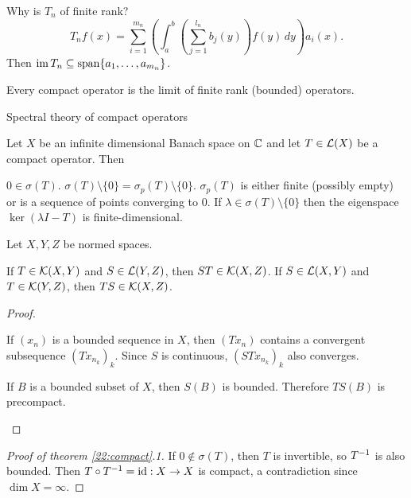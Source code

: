 Why is $T_n$ of finite rank?
\[ T_nf(x) = \sum_{i=1}^{m_n} \left( \int_a^b \left( \sum_{j=1}^{l_n} b_j(y) \right) f(y) \, dy \right) a_i(x). \]
Then $\operatorname{im} T_n \subseteq \operatorname{span}\{a_1,\ldots,a_{m_n}\}$.

\begin{rmk}
  Every compact operator is the limit of finite rank (bounded) operators.
\end{rmk}

Spectral theory of compact operators

\begin{thm}\label{22:compact}
  Let $X$ be an infinite dimensional Banach space on $\mathbb{C}$ and let $T \in \mathcal{L}(X)$ be a compact operator.
  Then
  \begin{enum}
    \io $0 \in \sigma(T)$.
    \io $\sigma(T) \setminus \{0\} = \sigma_p(T) \setminus \{0\}$.
    \io $\sigma_p(T)$ is either finite (possibly empty) or is a sequence of points converging to $0$.
    \io If $\lambda \in \sigma(T) \setminus \{0\}$ then the eigenspace $\ker(\lambda I-T)$ is finite-dimensional.
  \end{enum}
\end{thm}

\begin{prop}
  Let $X,Y,Z$ be normed spaces.
  \begin{enum}
    \io If $T \in \mathcal{K}(X,Y)$ and $S \in \mathcal{L}(Y,Z)$, then $ST \in \mathcal{K}(X,Z)$.
    \io If $S \in \mathcal{L}(X,Y)$ and $T \in \mathcal{K}(Y,Z)$, then $TS \in \mathcal{K}(X,Z)$.
  \end{enum}
\end{prop}

\begin{proof}
  \lv
  \begin{enum}
    \io
    If $(x_n)$ is a bounded sequence in $X$, then $(Tx_n)$ contains a convergent subsequence $(Tx_{n_k})_k$.
    Since $S$ is continuous, $(STx_{n_k})_k$ also converges.
    
    \io
    If $B$ is a bounded subset of $X$, then $S(B)$ is bounded.
    Therefore $TS(B)$ is precompact.
    \qedhere
  \end{enum}
\end{proof}

\begin{proof}[Proof of theorem \ref{22:compact}.1]
  If $0 \notin \sigma(T)$, then $T$ is invertible, so $T^{-1}$ is also bounded.
  Then $T \circ T^{-1} = \operatorname{id}: X \to X$ is compact, a contradiction since $\dim X = \infty$.
\end{proof}


